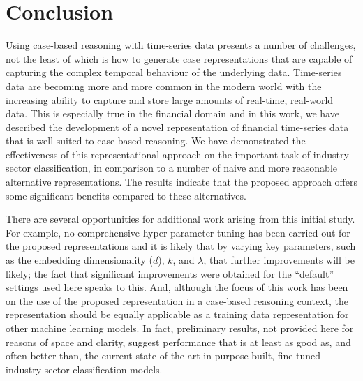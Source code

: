 \documentclass[runningheads]{llncs}
\begin{document}




\section{Conclusion}
Using case-based reasoning with time-series data presents a number of challenges, not the least of which is how to generate case representations that are capable of capturing the complex temporal behaviour of the underlying data. Time-series data are becoming more and more common in the modern world with the increasing ability to capture and store large amounts of real-time, real-world data. This is especially true in the financial domain and in this work, we have described the development of a novel representation of financial time-series data that is well suited to case-based reasoning. We have  demonstrated the effectiveness of this representational approach on the important task of industry sector classification, in comparison to a number of naive and more reasonable alternative representations. The results indicate that the proposed approach offers some significant benefits compared to these alternatives.

There are several opportunities for additional work arising from this initial study. For example, no comprehensive hyper-parameter tuning has been carried out for the proposed representations and it is likely that by varying key parameters, such as the embedding dimensionality ($d$), $k$, and $\lambda$, that further improvements will be likely; the fact that significant improvements were obtained for the ``default'' settings used here speaks to this. And, although the focus of this work has been on the use of the proposed representation in a case-based reasoning context, the representation should be equally applicable as a training data representation for other machine learning models. In fact, preliminary results, not provided here for reasons of space and clarity, suggest performance that is at least as good as, and often better than, the current state-of-the-art in purpose-built, fine-tuned industry sector classification models.
\end{document}
